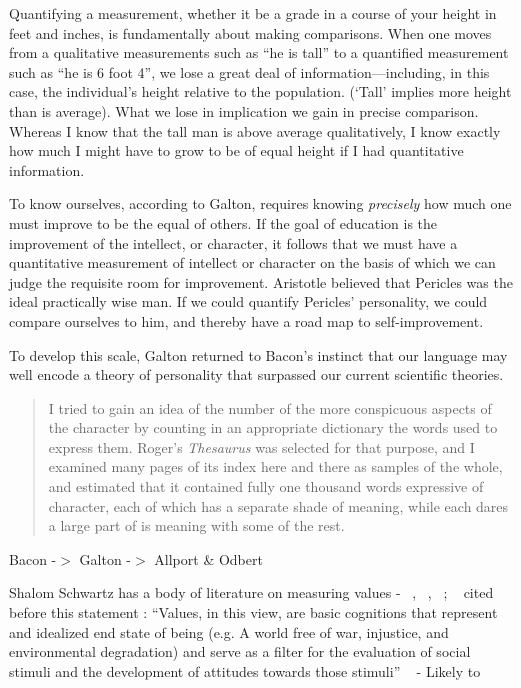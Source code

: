 Quantifying a measurement, whether it be a grade in a course of your height in feet and inches, is fundamentally about making comparisons. When one moves from a qualitative measurements such as ``he is tall'' to a quantified measurement such as ``he is 6 foot 4'', we lose a great deal of information---including, in this case, the individual's height relative to the population. (`Tall' implies more height than is average). What we lose in implication we gain in precise comparison. Whereas I know that the tall man is above average qualitatively, I know exactly how much I might have to grow to be of equal height if I had quantitative information.

To know ourselves, according to Galton, requires knowing \emph{precisely} how much one must improve to be the equal of others. If the goal of education is the improvement of the intellect, or character, it follows that we must have a quantitative measurement of intellect or character on the basis of which we can judge the requisite room for improvement. Aristotle believed that Pericles was the ideal practically wise man. If we could quantify Pericles' personality, we could compare ourselves to him, and thereby have a road map to self-improvement.

To develop this scale, Galton returned to Bacon's instinct that our language may well encode a theory of personality that surpassed our current scientific theories.

\begin{quote}

I tried to gain an idea of the number of the more conspicuous aspects of the character by counting in an appropriate dictionary the words used to express them. Roger's \emph{Thesaurus} was selected for that purpose, and I examined many pages of its index here and there as samples of the whole, and estimated that it contained fully one thousand words expressive of character, each of which has a separate shade of meaning, while each dares a large part of is meaning with some of the rest. ~\citep[p. 181]{Galton:1884ub}
\end{quote}

Bacon -$>$ Galton -$>$ Allport \& Odbert ~\citep{Allport:1936va}

Shalom Schwartz has a body of literature on measuring values - ~\citep{Schwartz:1992fj}, ~\citep{Stern:1999vx}, ~\citep{Stern:2000jq}; ~\citep{Whittaker:2006er} cited before this statement : ``Values, in this view, are basic cognitions that represent and idealized end state of being (e.g. A world free of war, injustice, and environmental degradation) and serve as a filter for the evaluation of social stimuli and the development of attitudes towards those stimuli'' ~\citep[p. 2]{Landon:2017dj} - Likely to ~\citep{Schwartz:1992fj}

